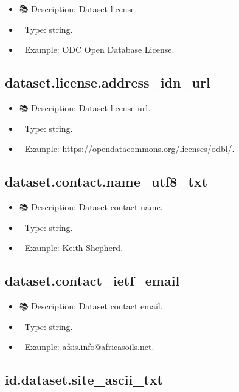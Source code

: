 \documentclass[
  letterpaper,
  DIV=11,
  numbers=noendperiod]{scrreprt}
\providecommand{\tightlist}{%
  \setlength{\itemsep}{0pt}\setlength{\parskip}{0pt}}\usepackage{longtable,booktabs,array}
\begin{document}
\begin{itemize}
\tightlist
\item
  📚 Description: Dataset license.
\item
  🔢 Type: string.
\item
  📖 Example: ODC Open Database License.
\end{itemize}

\subsection{dataset.license.address\_idn\_url}\label{dataset.license.address_idn_url}

\begin{itemize}
\tightlist
\item
  📚 Description: Dataset license url.
\item
  🔢 Type: string.
\item
  📖 Example: https://opendatacommons.org/licenses/odbl/.
\end{itemize}

\subsection{dataset.contact.name\_utf8\_txt}\label{dataset.contact.name_utf8_txt}

\begin{itemize}
\tightlist
\item
  📚 Description: Dataset contact name.
\item
  🔢 Type: string.
\item
  📖 Example: Keith Shepherd.
\end{itemize}

\subsection{dataset.contact\_ietf\_email}\label{dataset.contact_ietf_email}

\begin{itemize}
\tightlist
\item
  📚 Description: Dataset contact email.
\item
  🔢 Type: string.
\item
  📖 Example: afsis.info@africasoils.net.
\end{itemize}

\subsection{id.dataset.site\_ascii\_txt}\label{id.dataset.site_ascii_txt}
\end{document}
